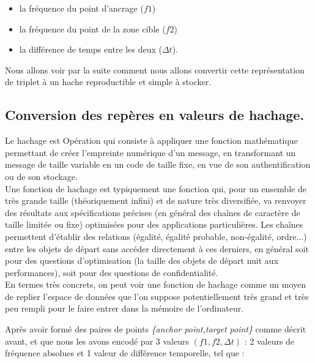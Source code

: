 \documentclass[11pt, report, french]{scrreprt}
\begin{document}
\begin{itemize}
	\item la fréquence du point d’ancrage ($f1$)
	\item la fréquence du point de la zone cible ($f2$)
	\item la différence de temps entre les deux ($\Delta t$).
\end{itemize}

\vspace{0.5cm}
Nous allons voir par la suite comment nous allons convertir cette représentation de triplet à un hache reproductible et simple à stocker.

\subsection{Conversion des repères en valeurs de hachage.}

Le hachage est Opération qui consiste à appliquer une fonction mathématique permettant de créer l'empreinte numérique d'un message, en transformant un message de taille variable en un code de taille fixe, en vue de son authentification ou de son stockage.\\

Une fonction de hachage est typiquement une fonction qui, pour un ensemble de très grande taille (théoriquement infini) et de nature très diversifiée, va renvoyer des résultats aux spécifications précises (en général des chaînes de caractère de taille limitée ou fixe) optimisées pour des applications particulières. Les chaînes permettent d'établir des relations (égalité, égalité probable, non-égalité, ordre...) entre les objets de départ sans accéder directement à ces derniers, en général soit pour des questions d'optimisation (la taille des objets de départ nuit aux performances), soit pour des questions de confidentialité.\\
En termes très concrets, on peut voir une fonction de hachage comme un moyen de replier l'espace de données que l'on suppose potentiellement très grand et très peu rempli pour le faire entrer dans la mémoire de l'ordinateur.\\\par

Après avoir formé des paires de points \textit{ \{anchor point,target point\}} comme décrit avant, et que nous les avons encodé par 3 valeurs $(f1, f2, \Delta t)$ : 2 valeurs de fréquence absolues et 1 valeur de diﬀérence temporelle, tel que :\\
\end{document}
